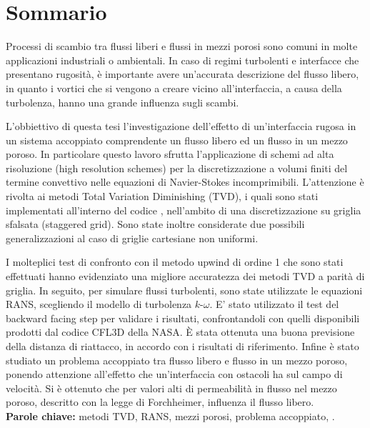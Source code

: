 \chapter*{Sommario}
Processi di scambio tra flussi liberi e flussi in mezzi porosi sono comuni in 
molte applicazioni industriali o ambientali. In caso di regimi turbolenti e 
interfacce che presentano rugosità, è importante avere un'accurata 
descrizione del flusso libero, in quanto i vortici che si vengono a creare 
vicino all'interfaccia, a causa della turbolenza, hanno una grande influenza 
sugli scambi.

L'obbiettivo di questa tesi l'investigazione dell'effetto di un'interfaccia rugosa in un sistema accoppiato comprendente un flusso libero ed un flusso in un mezzo poroso. In particolare questo lavoro sfrutta l'applicazione di schemi ad alta 
risoluzione (high resolution schemes) per la discretizzazione a volumi finiti 
del termine convettivo nelle equazioni di Navier-Stokes incomprimibili. L'attenzione è rivolta ai metodi Total Variation Diminishing (TVD), i quali sono stati implementati all'interno del codice \DUMUX, nell'ambito di una 
discretizzazione su griglia sfalsata (staggered grid). Sono state inoltre 
considerate due possibili generalizzazioni al caso di griglie cartesiane non 
uniformi.

I molteplici test di confronto con il metodo upwind di ordine 1 che sono stati 
effettuati hanno evidenziato una migliore accuratezza dei metodi TVD a parità 
di griglia. 
In seguito, per simulare flussi turbolenti, sono state utilizzate le equazioni 
RANS, scegliendo il modello di turbolenza $k\text{-}\omega$. E' stato 
utilizzato il test del backward facing step per validare i risultati, 
confrontandoli con quelli disponibili prodotti dal codice CFL3D della NASA. È 
stata ottenuta una buona previsione della distanza di riattacco, in accordo con 
i risultati di riferimento. Infine è stato studiato un problema accoppiato tra 
flusso libero e flusso in un mezzo poroso, ponendo attenzione all'effetto che 
un'interfaccia con ostacoli ha sul campo di velocità. Si è ottenuto 
che per valori alti di permeabilità in flusso nel mezzo poroso, descritto con 
la legge di Forchheimer, influenza il flusso libero.
\\[\baselineskip]
\textbf{Parole chiave:} metodi TVD, RANS, mezzi porosi, problema accoppiato, 
\DUMUX.
